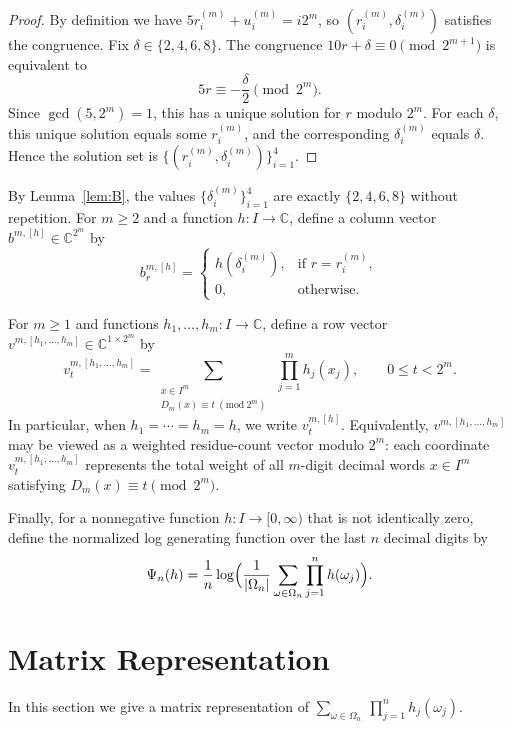 \documentclass[11pt,a4paper]{article}
\theoremstyle{plain}
\begin{document}
\begin{proof}
By definition we have $5 r_i^{(m)} + u_i^{(m)} = i 2^{m}$, so $(r_i^{(m)},\delta_i^{(m)})$ satisfies the congruence.
Fix $\delta\in\{2,4,6,8\}$.
The congruence $10r+\delta \equiv 0 \pmod{2^{m+1}}$ is equivalent to
\[
5r \equiv -\frac{\delta}{2} \pmod{2^{m}}.
\]
Since $\gcd(5,2^{m})=1$, this has a unique solution for $r$ modulo $2^{m}$.
For each $\delta$, this unique solution equals some $r_i^{(m)}$, and the corresponding $\delta_i^{(m)}$ equals $\delta$.
Hence the solution set is $\{(r_i^{(m)},\delta_i^{(m)})\}_{i=1}^4$.
\end{proof}

By Lemma~\ref{lem:B}, the values $\{\delta_i^{(m)}\}_{i=1}^4$ are exactly $\{2,4,6,8\}$ without repetition.
For $m\ge 2$ and a function $h:I\to\mathbb{C}$, define a column vector $b^{m,[h]}\in\mathbb{C}^{2^{m}}$ by
\[
b^{m,[h]}_r =
\begin{cases}
h(\delta_i^{(m)}), & \text{if } r = r_i^{(m)},\\[4pt]
0, & \text{otherwise}.
\end{cases}
\]

For $m\ge 1$ and functions $h_1,\dots,h_m:I\to\mathbb{C}$, define a row vector
$v^{m,[h_1,\dots,h_m]} \in \mathbb{C}^{1\times 2^{m}}$ by
\[
v_t^{m,[h_1,\dots,h_m]}
=\sum_{\substack{x\in I^m\\ D_m(x)\equiv t \  (\mathrm{mod}\ 2^m)}}
\ \prod_{j=1}^m h_j(x_j),\qquad 0\le t<2^m.
\]
In particular, when $h_1=\cdots=h_m=h$, we write $v_t^{m,[h]}$.
Equivalently, \(v^{m,[h_1,\dots,h_m]}\) may be viewed as a weighted residue-count vector modulo \(2^m\):  
each coordinate \(v_t^{m,[h_1,\dots,h_m]}\) represents the total weight of all \(m\)-digit decimal words \(x\in I^m\)  
satisfying \(D_m(x)\equiv t\pmod{2^m}\).




Finally, for a nonnegative function $h:I\to[0,\infty)$ that is not identically zero, define the normalized log generating function over the last $n$ decimal digits by
\[
  \Psi_n(h)
  = \frac{1}{n}\log \Bigl(
    \frac{1}{|\Omega_n|}
    \sum_{\omega\in\Omega_n}\prod_{j=1}^n h(\omega_j)
  \Bigr).
\]




\section{Matrix Representation}\label{sec:matrix}

In this section we give a matrix representation of $\sum_{\omega\in\Omega_n}\ \prod_{j=1}^n h_j(\omega_j)$.
\end{document}
